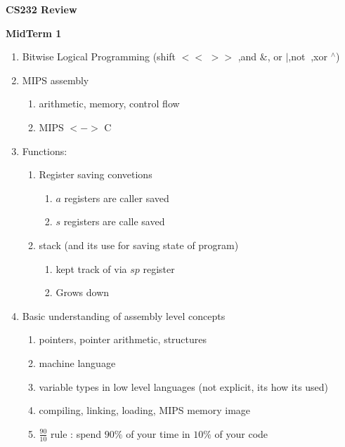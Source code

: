 \documentclass[12pt]{article}
\renewcommand{\=}[1]{\stackrel{#1}{=}} %
\theoremstyle{definition}
\theoremstyle{remark}
\begin{document}
\begin{center}
  {\LARGE
    \textbf{CS232 Review}\\
    \normalsize
  }
\end{center}
  \textbf{MidTerm 1}  
  \begin{enumerate}
  \item Bitwise Logical Programming (shift $<<$ $>>$ ,and $\&$, or
    $|$,not $~$,xor $^\wedge$)
  \item MIPS assembly
    \begin{enumerate}
    \item arithmetic, memory, control flow
    \item MIPS $<->$ C
    \end{enumerate}

  \item Functions:
    \begin{enumerate}
    \item Register saving convetions
      \begin{enumerate}
      \item $a$ registers are caller saved
      \item $s$ registers are calle saved
      \end{enumerate}

    \item stack (and its use for saving state of program)
      \begin{enumerate}
      \item kept track of via $sp$ register
      \item Grows down
      \end{enumerate}

    \end{enumerate}
  \item Basic understanding of assembly level concepts
    \begin{enumerate}
    \item pointers, pointer arithmetic, structures
    \item machine language
    \item variable types in low level languages (not explicit, its how
      its used)
    \item compiling, linking, loading, MIPS memory image
    \item $\frac{90}{10}$ rule : spend $90\%$ of your time in $10\%$ of your code
    \end{enumerate}

  \end{enumerate}
\end{document}
